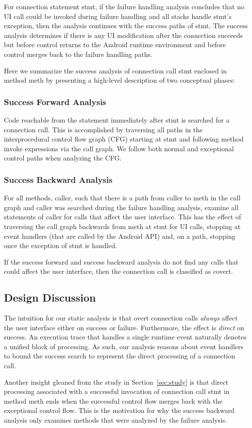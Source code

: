 For connection statement stmt, if the failure handling analysis
concludes that no UI call could be invoked during failure handling and
all stacks handle stmt's exception, then the analysis continues with
the success paths of stmt. The success analysis determines if there is
any UI modification after the connection succeeds but before control
returns to the Android runtime environment and before control merges
back to the failure handling paths.

Here we summarize the success analysis of connection call stmt enclosed
in method meth by presenting a high-level description of two conceptual
phases:

\subsubsection{Success Forward Analysis} Code reachable from the
  statement immediately after stmt is searched for a connection call.
  This is accomplished by traversing all paths in the interprocedural
  control flow graph (CFG) starting at stmt and following method invoke
  expressions via the call graph.  We follow both normal and
  exceptional control paths when analyzing the CFG.

\subsubsection{Success Backward Analysis} For all methods, caller, such
  that there is a path from caller to meth in the call graph and caller was
  searched during the failure handling analysis, examine all
  statements of caller for calls that affect the user interface.  This
  has the effect of traversing the call graph backwards from meth at
  stmt for UI calls, stopping at event handlers (that are called by the
  Android API) and, on a path, stopping once the exception of stmt is
  handled.

If the success forward and success backward analysis do not find any
calls that could affect the user interface, then the connection call
is classified as covert.

\subsection{Design Discussion}

The intuition for our static analysis is that overt connection calls
{\it always} affect the user interface either on success or
failure. Furthermore, the effect is {\it direct} on success.  An
execution trace that handles a single runtime event naturally denotes
a unified block of processing. As such, our analysis reasons about
event handlers to bound the success search to represent the direct
processing of a connection call.

Another insight gleaned from the study in Section~\ref{sec:study} is
that direct processing associated with a successful invocation of
connection call stmt in method meth ends when the successful control
flow merges back with the exceptional control flow. This is the
motivation for why the success backward analysis only examines methods
that were analyzed by the failure analysis.  

